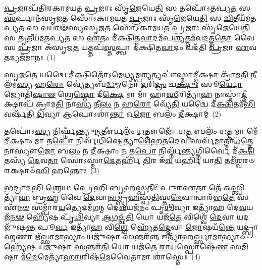\setcounter{anuvakam}{0}
\-\ul{𑌪𑍍𑌰}\-𑌜𑌾𑌪᳴𑌤𑌿𑌰𑌕𑌾𑌮𑌯𑌤 \ul{𑌪𑍍𑌰}\-𑌜𑌾𑌃 𑌸𑍃᳴\-\ul{𑌜𑍇}\-𑌯𑍇\-\ul{𑌤𑌿} 𑌸 𑌤𑌪𑍋᳴\-𑌽𑌤𑌪𑍍𑌯\-\ul{𑌤} 𑌸 \ul{𑌸}\-𑌰𑍍𑌪𑌾𑌨᳴𑌸𑍃𑌜\-\ul{𑌤} 𑌸𑍋᳴\-𑌽𑌕𑌾𑌮𑌯𑌤 \ul{𑌪𑍍𑌰}\-𑌜𑌾𑌃 𑌸𑍃᳴\-\ul{𑌜𑍇}\-𑌯𑍇\-\ul{𑌤𑌿} 𑌸 \ul{𑌦𑍍𑌵𑌿}\-𑌤𑍀𑌯᳴𑌮\-𑌤𑌪𑍍𑌯\-\ul{𑌤} 𑌸 𑌵𑌯𑌾𑍟᳴𑌸𑍍𑌯𑌸𑍃𑌜\-\ul{𑌤} 𑌸𑍋᳴\-𑌽𑌕𑌾𑌮𑌯𑌤 \ul{𑌪𑍍𑌰}\-𑌜𑌾𑌃 𑌸𑍃᳴\-\ul{𑌜𑍇}\-𑌯𑍇\-\ul{𑌤𑌿} 𑌸 \ul{𑌤𑍃}\-𑌤𑍀𑌯᳴𑌮𑌤𑌪𑍍𑌯\-\ul{𑌤} 𑌸 \ul{𑌏}\-𑌤𑌂 𑌦𑍀॑𑌕𑍍𑌷𑌿𑌤\-\ul{𑌵𑌾}\-𑌦𑌮᳴𑌪\-\ul{𑌶𑍍𑌯}\-𑌤𑍍𑌤𑌮᳴𑌵\-\ul{𑌦}\-𑌤𑍍𑌤\-\ul{𑌤𑍋} 𑌵𑍈 𑌸 \ul{𑌪𑍍𑌰}\-𑌜𑌾 𑌅᳴𑌸𑍃𑌜\-\ul{𑌤} 𑌯𑌤𑍍𑌤𑌪᳴\-\ul{𑌸𑍍𑌤}\-𑌪𑍍𑌤𑍍𑌵𑌾 𑌦𑍀॑𑌕𑍍𑌷𑌿𑌤\-\ul{𑌵𑌾}\-𑌦𑌂 𑌵𑌦᳴𑌤𑌿 \ul{𑌪𑍍𑌰}\-𑌜𑌾 \ul{𑌏}\-𑌵 𑌤𑌦𑍍𑌯𑌜᳴𑌮𑌾𑌨𑌃~(1)

\-\ul{𑌸𑍃}\-\-\ul{𑌜}\-\-\ul{𑌤𑍇} 𑌯𑌦𑍍𑌵𑍈 𑌦𑍀॑\-\ul{𑌕𑍍𑌷𑌿}\-𑌤𑍋᳴\-𑌽\-\ul{𑌮𑍇}\-𑌧𑍍𑌯𑌮𑍍𑌪\-\ul{𑌶𑍍𑌯}\-𑌤𑍍𑌯𑌪𑌾॑𑌸𑍍𑌮𑌾\-\ul{𑌦𑍍𑌦𑍀}\-𑌕𑍍𑌷𑌾 𑌕𑍍𑌰𑌾᳴𑌮\-\ul{𑌤𑌿} 𑌨𑍀𑌲᳴𑌮\-\ul{𑌸𑍍𑌯} 𑌹\-\ul{𑌰𑍋} 𑌵𑍍𑌯𑍇॑𑌤𑍍𑌯𑌬᳴\-\ul{𑌦𑍍𑌧}\-𑌮𑍍𑌮𑌨𑍋᳴ \ul{𑌦}\-𑌰𑌿\-\ul{𑌦𑍍𑌰𑌂} 𑌚\-\ul{𑌕𑍍𑌷𑍁𑌃} 𑌸𑍂\-\ul{𑌰𑍍𑌯𑍋} 𑌜𑍍𑌯𑍋𑌤𑌿᳴\-\ul{𑌷𑌾}\-\-\ul{𑍟} 𑌶𑍍𑌰𑍇\-\ul{𑌷𑍍𑌠𑍋} 𑌦𑍀\-\ul{𑌕𑍍𑌷𑍇} 𑌮𑌾 𑌮𑌾᳴ 𑌹𑌾\-\ul{𑌸𑍀}\-𑌰𑌿𑌤𑍍𑌯𑌾᳴\-\ul{𑌹} 𑌨𑌾𑌸𑍍𑌮𑌾॑\-\ul{𑌦𑍍𑌦𑍀}\-𑌕𑍍𑌷𑌾𑌪᳴ 𑌕𑍍𑌰𑌾𑌮\-\ul{𑌤𑌿} 𑌨𑌾\-\ul{𑌸𑍍𑌯} 𑌨𑍀\-\ul{𑌲𑌂} 𑌨 𑌹\-\ul{𑌰𑍋} 𑌵𑍍𑌯𑍇᳴\-\ul{𑌤𑌿} 𑌯𑌦𑍍𑌵𑍈 𑌦𑍀॑\-\ul{𑌕𑍍𑌷𑌿}\-𑌤𑌮᳴\-\ul{𑌭𑌿}\-𑌵𑌰𑍍\mbox{}𑌷᳴𑌤𑌿 \ul{𑌦𑌿}\-𑌵𑍍𑌯𑌾 𑌆𑌪𑍋\-𑌽𑌶𑌾॑\-\ul{𑌨𑍍𑌤𑌾} 𑌓\-\ul{𑌜𑍋} 𑌬𑌲𑌂᳴ \ul{𑌦𑍀}\-𑌕𑍍𑌷𑌾𑌮𑍍~(2)

𑌤𑌪𑍋॑\-𑌽\-\ul{𑌸𑍍𑌯} 𑌨𑌿𑌰𑍍𑌘𑍍𑌨᳴𑌨𑍍𑌤𑍍𑌯𑍁\-\ul{𑌨𑍍𑌦}\-𑌤𑍀𑌰𑍍𑌬𑌲𑌂᳴ \ul{𑌧}\-𑌤𑍍𑌤𑍗𑌜𑍋᳴ 𑌧\-\ul{𑌤𑍍𑌤} 𑌬𑌲𑌂᳴ 𑌧\-\ul{𑌤𑍍𑌤} 𑌮𑌾 𑌮𑍇᳴ \ul{𑌦𑍀}\-𑌕𑍍𑌷𑌾𑌂 𑌮𑌾 𑌤\-\ul{𑌪𑍋} 𑌨𑌿𑌰𑍍𑌵᳴\-\ul{𑌧𑌿}\-𑌷𑍍𑌟𑍇𑌤𑍍𑌯𑌾᳴\-\ul{𑌹𑍈}\-𑌤\-\ul{𑌦𑍇}\-𑌵 𑌸𑌰𑍍𑌵᳴\-\ul{𑌮𑌾}\-𑌤𑍍𑌮𑌨𑍍𑌧᳴\-\ul{𑌤𑍍𑌤𑍇} 𑌨𑌾𑌸𑍍𑌯𑍗\-\ul{𑌜𑍋} 𑌬\-\ul{𑌲𑌂} 𑌨 \ul{𑌦𑍀}\-𑌕𑍍𑌷𑌾𑌂 𑌨 𑌤\-\ul{𑌪𑍋} 𑌨𑌿𑌰𑍍𑌘𑍍𑌨᳴\-\ul{𑌨𑍍𑌤𑍍𑌯}\-𑌗𑍍𑌨𑌿𑌰𑍍𑌵𑍈 𑌦𑍀॑\-\ul{𑌕𑍍𑌷𑌿}\-𑌤𑌸𑍍𑌯᳴ \ul{𑌦𑍇}\-𑌵\-\ul{𑌤𑌾} 𑌸𑍋॑\-𑌽𑌸𑍍𑌮𑌾\-\ul{𑌦𑍇}\-𑌤𑌰𑍍\mbox{}𑌹𑌿᳴ \ul{𑌤𑌿}\-𑌰 𑌇᳴\-\ul{𑌵} 𑌯𑌰𑍍\mbox{}\-\ul{𑌹𑌿} 𑌯𑌾\-\ul{𑌤𑌿} 𑌤𑌮𑍀॑\-\ul{𑌶𑍍𑌵}\-𑌰𑍞 𑌰𑌕𑍍𑌷𑌾𑍞᳴\-\ul{𑌸𑌿} 𑌹𑌨𑍍𑌤𑍋𑌃॑~(3)

\-\ul{𑌭}\-𑌦𑍍𑌰𑌾\-\ul{𑌦}\-𑌭𑌿 𑌶𑍍𑌰𑍇\-\ul{𑌯𑌃} 𑌪𑍍𑌰𑍇\-\ul{𑌹𑌿} 𑌬𑍃\-\ul{𑌹}\-𑌸𑍍𑌪𑌤𑌿𑌃᳴ 𑌪𑍁𑌰\-\ul{𑌏}\-𑌤𑌾 𑌤𑍇᳴ \ul{𑌅}\-𑌸𑍍𑌤𑍍𑌵𑌿𑌤𑍍𑌯𑌾᳴\-\ul{𑌹} 𑌬𑍍𑌰\-\ul{𑌹𑍍𑌮} 𑌵𑍈 \ul{𑌦𑍇}\-𑌵𑌾\-\ul{𑌨𑌾}\-𑌮𑍍𑌬𑍃\-\ul{𑌹}\-𑌸𑍍𑌪\-\ul{𑌤𑌿}\-𑌸𑍍𑌤\-\ul{𑌮𑍇}\-𑌵𑌾𑌨𑍍𑌵𑌾𑌰᳴𑌭\-\ul{𑌤𑍇} 𑌸 𑌏᳴\-\ul{𑌨}\-\-\ul{𑍞} 𑌸𑌮𑍍𑌪𑌾᳴𑌰\-\ul{𑌯}\-𑌤𑍍𑌯𑍇𑌦𑌮᳴𑌗𑌨𑍍𑌮 𑌦𑍇\-\ul{𑌵}\-𑌯𑌜᳴𑌨𑌂 𑌪𑍃\-\ul{𑌥𑌿}\-𑌵𑍍𑌯𑌾 𑌇𑌤𑍍𑌯𑌾᳴𑌹 𑌦𑍇\-\ul{𑌵}\-𑌯𑌜᳴\-\ul{𑌨}\-\-\ul{𑍟} 𑌹𑍍𑌯𑍇᳴𑌷 𑌪𑍃᳴\-\ul{𑌥𑌿}\-𑌵𑍍𑌯𑌾 \ul{𑌆}\-𑌗𑌚𑍍𑌛᳴\-\ul{𑌤𑌿} 𑌯𑍋 𑌯𑌜᳴\-\ul{𑌤𑍇} 𑌵𑌿𑌶𑍍𑌵𑍇᳴ \ul{𑌦𑍇}\-𑌵𑌾 𑌯𑌦𑌜𑍁᳴𑌷\-\ul{𑌨𑍍𑌤} 𑌪𑍂\-\ul{𑌰𑍍𑌵} 𑌇𑌤𑍍𑌯𑌾᳴\-\ul{𑌹} 𑌵𑌿\-\ul{𑌶𑍍𑌵𑍇} 𑌹𑍍𑌯𑍇᳴𑌤\-\ul{𑌦𑍍𑌦𑍇}\-𑌵𑌾 \ul{𑌜𑍋}\-𑌷𑌯᳴\-\ul{𑌨𑍍𑌤𑍇} 𑌯𑌦𑍍𑌬𑍍𑌰𑌾॑\-\ul{𑌹𑍍𑌮}\-𑌣𑌾 𑌋᳴\-\ul{𑌖𑍍𑌸𑌾}\-𑌮𑌾\-\ul{𑌭𑍍𑌯𑌾𑌂} 𑌯𑌜𑍁᳴𑌷𑌾 \ul{𑌸}\-𑌨𑍍𑌤𑌰᳴\-\ul{𑌨𑍍𑌤} 𑌇𑌤𑍍𑌯𑌾᳴𑌹\-\ul{𑌰𑍍𑌖𑍍𑌸𑌾}\-𑌮𑌾\-\ul{𑌭𑍍𑌯𑌾}\-\-\ul{𑍞} 𑌹𑍍𑌯𑍇᳴𑌷 𑌯𑌜𑍁᳴𑌷𑌾 \ul{𑌸}\-𑌨𑍍𑌤𑌰᳴\-\ul{𑌤𑌿} 𑌯𑍋 𑌯𑌜᳴𑌤𑍇 \ul{𑌰𑌾}\-𑌯𑌸𑍍𑌪𑍋𑌷𑍇᳴\-\ul{𑌣} 𑌸\-\ul{𑌮𑌿}\-𑌷𑌾 𑌮᳴\-\ul{𑌦𑍇}\-𑌮𑍇𑌤𑍍𑌯𑌾᳴\-\ul{𑌹𑌾}\-𑌶𑌿𑌷᳴\-\ul{𑌮𑍇}\-𑌵𑍈𑌤𑌾𑌮𑌾 𑌶𑌾॑𑌸𑍍𑌤𑍇॥~(4)

